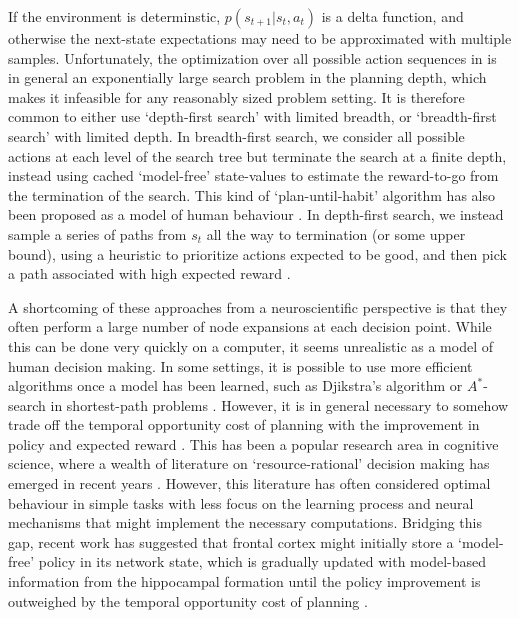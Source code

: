 \vspace{-2 em}

If the environment is determinstic, $p(s_{t+1} | s_t, a_t)$ is a delta function, and otherwise the next-state expectations may need to be approximated with multiple samples.
Unfortunately, the optimization over all possible action sequences in  is in general an exponentially large search problem in the planning depth, which makes it infeasible for any reasonably sized problem setting.
It is therefore common to either use `depth-first search' with limited breadth, or `breadth-first search' with limited depth.
In breadth-first search, we consider all possible actions at each level of the search tree but terminate the search at a finite depth, instead using cached `model-free' state-values to estimate the reward-to-go from the termination of the search.
This kind of `plan-until-habit' algorithm has also been proposed as a model of human behaviour \citep{keramati2016adaptive}.
In depth-first search, we instead sample a series of paths from $s_t$ all the way to termination (or some upper bound), using a heuristic to prioritize actions expected to be good, and then pick a path associated with high expected reward \citep{huys2012bonsai}.



A shortcoming of these approaches from a neuroscientific perspective is that they often perform a large number of node expansions at each decision point.
While this can be done very quickly on a computer, it seems unrealistic as a model of human decision making.
In some settings, it is possible to use more efficient algorithms once a model has been learned, such as Djikstra's algorithm or $A^*$-search in shortest-path problems \citep{hart1968formal}.
However, it is in general necessary to somehow trade off the temporal opportunity cost of planning with the improvement in policy and expected reward \citep{botvinick2014computational,agrawal2022temporal}.
This has been a popular research area in cognitive science, where a wealth of literature on `resource-rational' decision making has emerged in recent years \citep{griffiths2019doing,callaway2022rational}.
However, this literature has often considered optimal behaviour in simple tasks with less focus on the learning process and neural mechanisms that might implement the necessary computations.
Bridging this gap, recent work has suggested that frontal cortex might initially store a `model-free' policy in its network state, which is gradually updated with model-based information from the hippocampal formation until the policy improvement is outweighed by the temporal opportunity cost of planning \citep{jensen2023recurrent}.


